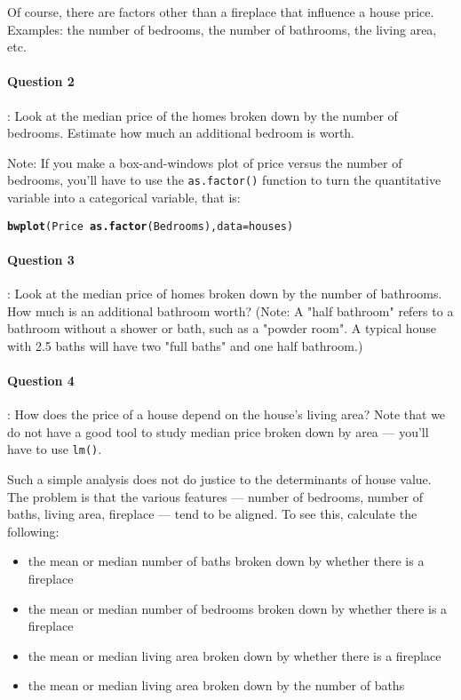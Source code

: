 \documentclass{article}\usepackage[]{graphicx}\usepackage[]{color}
\makeatletter
\newcommand{\hlopt}[1]{\textcolor[rgb]{0,0,0}{#1}}%
\newcommand{\hlstd}[1]{\textcolor[rgb]{0.345,0.345,0.345}{#1}}%
\newcommand{\hlkwc}[1]{\textcolor[rgb]{0.333,0.667,0.333}{#1}}%
\newcommand{\hlkwd}[1]{\textcolor[rgb]{0.737,0.353,0.396}{\textbf{#1}}}%
\newenvironment{kframe}{%
 \def\at@end@of@kframe{}%
 \ifinner\ifhmode%
  \def\at@end@of@kframe{\end{minipage}}%
  \begin{minipage}{\columnwidth}%
 \fi\fi%
 \def\FrameCommand##1{\hskip\@totalleftmargin \hskip-\fboxsep
 \colorbox{shadecolor}{##1}\hskip-\fboxsep
     \hskip-\linewidth \hskip-\@totalleftmargin \hskip\columnwidth}%
 \MakeFramed {\advance\hsize-\width
   \@totalleftmargin\z@ \linewidth\hsize
   \@setminipage}}%
 {\par\unskip\endMakeFramed%
 \at@end@of@kframe}
\newenvironment{knitrout}{}{} %
\makeatother
\begin{document}
\begin{multicols}{2}
\bigskip

Of course, there are factors other than a fireplace that influence a house price.  Examples: the number of bedrooms, the number of bathrooms, the living area, etc.

\bigskip

\paragraph{Question 2}: Look at the median price of the homes broken down by the number of bedrooms.  Estimate how much an additional bedroom is worth.

Note: If you make a box-and-windows plot of price versus the number of bedrooms, you'll have to use the \texttt{as.factor()} function to turn the quantitative variable into a categorical variable, that is:
\begin{knitrout}
\color{fgcolor}\begin{kframe}
\begin{alltt}
\hlkwd{bwplot}\hlstd{( Price} \hlopt{~} \hlkwd{as.factor}\hlstd{(Bedrooms),} \hlkwc{data}\hlstd{=houses )}
\end{alltt}
\end{kframe}
\end{knitrout}

\paragraph{Question 3}: Look at the median price of homes broken down by the number of bathrooms.  How much is an additional bathroom worth?  (Note: A "half bathroom" refers to a bathroom without a shower or bath, such as a "powder room".  A typical house with 2.5 baths will have two "full baths" and one half bathroom.)

\bigskip

\paragraph{Question 4}: How does the price of a house depend on the house's living area?  Note that we do not have a good tool to study median price broken down by area --- you'll have to use \texttt{lm()}.

\bigskip

Such a simple analysis does not do justice to the determinants of house value.  The problem is that the various features --- number of bedrooms, number of baths, living area, fireplace --- tend to be aligned.  To see this, calculate the following:
\begin{itemize}
\item the mean or median number of baths broken down by whether there is a fireplace
\item the mean or median  number of bedrooms broken down by whether there is a fireplace
\item the mean or median living area broken down by whether there is a fireplace
\item the mean or median living area broken down by the number of baths
\end{itemize}


\end{multicols}
\end{document}

